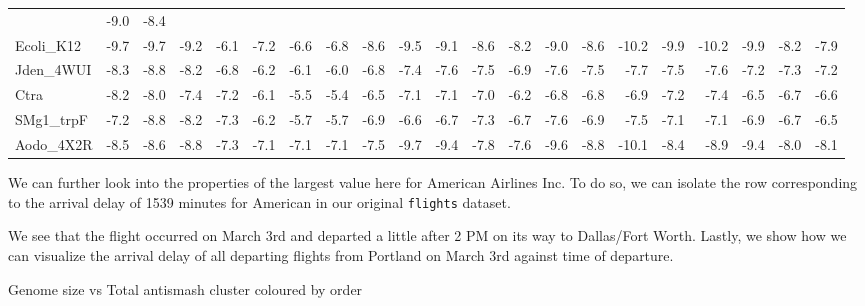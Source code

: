 \documentclass[12pt,twoside]{reedthesis}
\begin{document}
\begin{longtable}[c]{@{}lrrrrrrrrrrrrrrrrrrrr@{}}
  & -9.0 & -8.4\tabularnewline
  Ecoli\_K12 & -9.7 & -9.7 & -9.2 & -6.1 & -7.2 & -6.6 & -6.8 & -8.6 &
  -9.5 & -9.1 & -8.6 & -8.2 & -9.0 & -8.6 & -10.2 & -9.9 & -10.2 & -9.9 &
  -8.2 & -7.9\tabularnewline
  Jden\_4WUI & -8.3 & -8.8 & -8.2 & -6.8 & -6.2 & -6.1 & -6.0 & -6.8 &
  -7.4 & -7.6 & -7.5 & -6.9 & -7.6 & -7.5 & -7.7 & -7.5 & -7.6 & -7.2 &
  -7.3 & -7.2\tabularnewline
  Ctra & -8.2 & -8.0 & -7.4 & -7.2 & -6.1 & -5.5 & -5.4 & -6.5 & -7.1 &
  -7.1 & -7.0 & -6.2 & -6.8 & -6.8 & -6.9 & -7.2 & -7.4 & -6.5 & -6.7 &
  -6.6\tabularnewline
  SMg1\_trpF & -7.2 & -8.8 & -8.2 & -7.3 & -6.2 & -5.7 & -5.7 & -6.9 &
  -6.6 & -6.7 & -7.3 & -6.7 & -7.6 & -6.9 & -7.5 & -7.1 & -7.1 & -6.9 &
  -6.7 & -6.5\tabularnewline
  Aodo\_4X2R & -8.5 & -8.6 & -8.8 & -7.3 & -7.1 & -7.1 & -7.1 & -7.5 &
  -9.7 & -9.4 & -7.8 & -7.6 & -9.6 & -8.8 & -10.1 & -8.4 & -8.9 & -9.4 &
  -8.0 & -8.1\tabularnewline
  \bottomrule
  \end{longtable}
  
  We can further look into the properties of the largest value here for
  American Airlines Inc. To do so, we can isolate the row corresponding to
  the arrival delay of 1539 minutes for American in our original
  \texttt{flights} dataset.
  
  \begin{Shaded}
  \end{Shaded}
  
  We see that the flight occurred on March 3rd and departed a little after
  2 PM on its way to Dallas/Fort Worth. Lastly, we show how we can
  visualize the arrival delay of all departing flights from Portland on
  March 3rd against time of departure.
  
  \begin{Shaded}
  \end{Shaded}
  
  Genome size vs Total antismash cluster coloured by order
  
\end{document}

